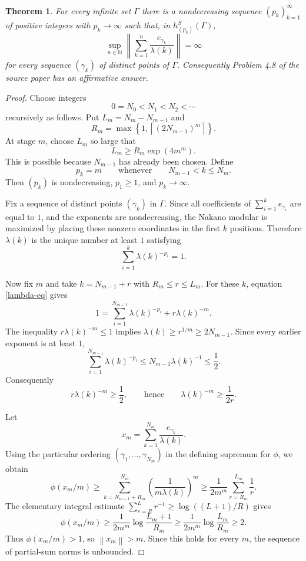 \documentclass[11pt]{amsart}
\newtheorem{theorem}{Theorem}
\newcommand{\N}{\mathbb N}
\newcommand{\norm}[1]{\left\|#1\right\|}
\begin{document}
\begin{theorem}
For every infinite set $\Gamma$ there is a nondecreasing sequence
$(p_k)_{k=1}^\infty$ of positive integers with $p_k\to\infty$ such that, in
$h^S_{(p_k)}(\Gamma)$,
\[
 \sup_{n\in\N}\left\|\sum_{k=1}^n \frac{e_{\gamma_k}}{\lambda(k)}\right\|
 =\infty
\]
for every sequence $(\gamma_k)$ of distinct points of $\Gamma$.  Consequently
Problem 4.8 of the source paper has an affirmative answer.
\end{theorem}

\begin{proof}
Choose integers
\[
 0=N_0<N_1<N_2<\cdots
\]
recursively as follows.  Put $L_m=N_m-N_{m-1}$ and
\[
 R_m=\max\left\{1,\left\lceil (2N_{m-1})^m\right\rceil\right\}.
\]
At stage $m$, choose $L_m$ so large that
\[
 L_m\geq R_m \exp(4m^m).
\]
This is possible because $N_{m-1}$ has already been chosen.  Define
\[
 p_k=m \qquad\text{whenever}\qquad N_{m-1}<k\leq N_m.
\]
Then $(p_k)$ is nondecreasing, $p_1\geq 1$, and $p_k\to\infty$.

Fix a sequence of distinct points $(\gamma_k)$ in $\Gamma$.  Since all
coefficients of $\sum_{i=1}^k e_{\gamma_i}$ are equal to $1$, and the exponents
are nondecreasing, the Nakano modular is maximized by placing these nonzero
coordinates in the first $k$ positions.  Therefore $\lambda(k)$ is the unique
number at least $1$ satisfying
\begin{equation}\label{lambda-eq}
 \sum_{i=1}^k \lambda(k)^{-p_i}=1 .
\end{equation}

Now fix $m$ and take $k=N_{m-1}+r$ with $R_m\leq r\leq L_m$.  For these $k$,
equation \eqref{lambda-eq} gives
\[
 1=
 \sum_{i=1}^{N_{m-1}} \lambda(k)^{-p_i}
 + r\lambda(k)^{-m}.
\]
The inequality $r\lambda(k)^{-m}\leq 1$ implies
$\lambda(k)\geq r^{1/m}\geq 2N_{m-1}$.  Since every earlier exponent is at
least $1$,
\[
 \sum_{i=1}^{N_{m-1}}\lambda(k)^{-p_i}
 \leq N_{m-1}\lambda(k)^{-1}\leq \frac12 .
\]
Consequently
\[
 r\lambda(k)^{-m}\geq \frac12,
 \qquad\text{hence}\qquad
 \lambda(k)^{-m}\geq \frac{1}{2r}.
\]

Let
\[
 x_m=\sum_{k=1}^{N_m}\frac{e_{\gamma_k}}{\lambda(k)}.
\]
Using the particular ordering $(\gamma_1,\ldots,\gamma_{N_m})$ in the defining
supremum for $\phi$, we obtain
\[
 \phi(x_m/m)\geq
 \sum_{k=N_{m-1}+R_m}^{N_m}
 \left(\frac{1}{m\lambda(k)}\right)^m
 \geq
 \frac{1}{2m^m}\sum_{r=R_m}^{L_m}\frac1r .
\]
The elementary integral estimate
$\sum_{r=R}^{L}r^{-1}\geq \log((L+1)/R)$ gives
\[
 \phi(x_m/m)
 \geq \frac{1}{2m^m}\log\frac{L_m+1}{R_m}
 \geq \frac{1}{2m^m}\log\frac{L_m}{R_m}
 \geq 2.
\]
Thus $\phi(x_m/m)>1$, so $\norm{x_m}>m$.  Since this holds for every $m$, the
sequence of partial-sum norms is unbounded.
\end{proof}
\end{document}
